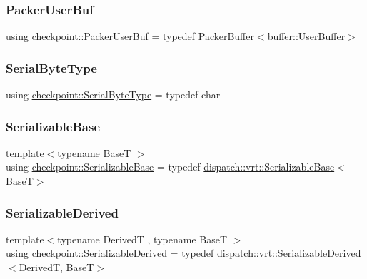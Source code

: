 \subsubsection{\texorpdfstring{Packer\+User\+Buf}{PackerUserBuf}}
{\footnotesize\ttfamily using \hyperlink{namespacecheckpoint_a72c31e3d94e3b4d05bca5972bacc536a}{checkpoint\+::\+Packer\+User\+Buf} = typedef \hyperlink{structcheckpoint_1_1_packer_buffer}{Packer\+Buffer}$<$\hyperlink{structcheckpoint_1_1buffer_1_1_user_buffer}{buffer\+::\+User\+Buffer}$>$}

\mbox{\label{namespacecheckpoint_ae57f01cdc0b81776c23b6c7c934c58f5}} 
\subsubsection{\texorpdfstring{Serial\+Byte\+Type}{SerialByteType}}
{\footnotesize\ttfamily using \hyperlink{namespacecheckpoint_ae57f01cdc0b81776c23b6c7c934c58f5}{checkpoint\+::\+Serial\+Byte\+Type} = typedef char}

\mbox{\label{namespacecheckpoint_ae8adefa66d7575697f8e465bed48e3cc}} 
\subsubsection{\texorpdfstring{Serializable\+Base}{SerializableBase}}
{\footnotesize\ttfamily template$<$typename BaseT $>$ \\
using \hyperlink{namespacecheckpoint_ae8adefa66d7575697f8e465bed48e3cc}{checkpoint\+::\+Serializable\+Base} = typedef \hyperlink{structcheckpoint_1_1dispatch_1_1vrt_1_1_serializable_base}{dispatch\+::vrt\+::\+Serializable\+Base}$<$BaseT$>$}

\mbox{\label{namespacecheckpoint_a9c4afb2c8d1bc1f58b9e158d64331d65}} 
\subsubsection{\texorpdfstring{Serializable\+Derived}{SerializableDerived}}
{\footnotesize\ttfamily template$<$typename DerivedT , typename BaseT $>$ \\
using \hyperlink{namespacecheckpoint_a9c4afb2c8d1bc1f58b9e158d64331d65}{checkpoint\+::\+Serializable\+Derived} = typedef \hyperlink{structcheckpoint_1_1dispatch_1_1vrt_1_1_serializable_derived}{dispatch\+::vrt\+::\+Serializable\+Derived}$<$DerivedT, BaseT$>$}

